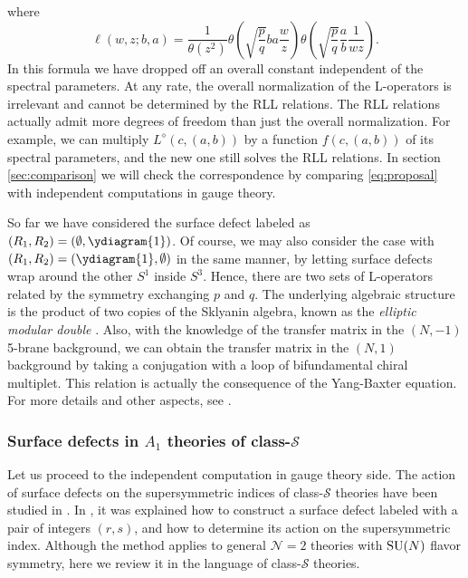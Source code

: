 where
\begin{equation}
    \ell(w,z;b,a)
      =
        \frac{1}{\theta(z^{2})}
        \theta\left(\sqrt{\frac{p}{q}}ba\frac{w}{z}\right)
        \theta\left(\sqrt{\frac{p}{q}}\frac{a}{b}\frac{1}{wz}\right).
\end{equation}
In this formula we have dropped off an overall constant independent
of the spectral parameters. At any rate, the overall normalization
of the L-operators is irrelevant and cannot be determined by the RLL relations. The
RLL relations actually admit more degrees of freedom than just the
overall normalization. For example, we can multiply $L^{\diamond}(c,(a,b))$
by a function $f(c,(a,b))$ of its spectral parameters, and the new
one still solves the RLL relations. In section \ref{sec:comparison} we will
check the correspondence by comparing \eqref{eq:proposal} with independent computations in
gauge theory.

So far we have considered the surface defect labeled as $( R_{1},R_{2} )=( \emptyset, \ydiagram{1} )$.
Of course, we may also consider the case with $( R_{1},R_{2} )=( \ydiagram{1},\emptyset )$
in the same manner, by letting surface defects wrap around the other
$S^{1}$ inside $S^{3}$. Hence, there are two sets of L-operators
related by the symmetry exchanging $p$ and $q$. The underlying algebraic
structure is the product of two copies of the Sklyanin algebra, known
as the \emph{elliptic modular double} \cite{MR2492363}.
Also, with the knowledge of the transfer matrix in the $(N,-1)$ 5-brane background,
we can obtain the transfer matrix in the $(N,1)$ background by taking a conjugation
with a loop of bifundamental chiral multiplet. This relation is actually the consequence of
the Yang-Baxter equation.
For more details and other aspects, see \cite{Maruyoshi:2016caf}.








\subsubsection{Surface defects in $A_{1}$ theories of class-$\mathcal{S}$}

Let us proceed to the independent computation in gauge theory side.
The action of surface defects on the
supersymmetric indices of class-$\mathcal{S}$ theories have been
studied in \cite{Gaiotto:2012xa, Gadde:2013dda, Alday:2013kda,Bullimore:2014nla}.
In \cite{Gaiotto:2012xa}, it was explained how to construct
a surface defect labeled with a pair of integers $(r,s)$, and how
to determine its action on the supersymmetric index. Although the
method applies to general $\mathcal{N}=2$ theories with $\mathrm{SU}(N)$
flavor symmetry, here we review it in the language of class-$\mathcal{S}$
theories.

